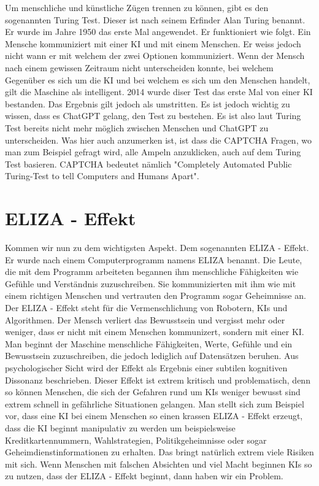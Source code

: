 \documentclass{report}
\begin{document}
Um menschliche und künstliche Zügen trennen zu können, gibt es den sogenannten Turing Test. Dieser ist nach seinem Erfinder Alan Turing benannt. Er wurde im Jahre 1950 das erste Mal angewendet. Er funktioniert wie folgt.
Ein Mensche kommuniziert mit einer KI und mit einem Menschen. Er weiss jedoch nicht wann er mit welchem der zwei Optionen kommuniziert. Wenn der Mensch nach einem gewissen Zeitraum nicht unterscheiden konnte, bei welchem Gegenüber es sich um die KI und bei welchem es sich um den Menschen handelt, gilt die Maschine als intelligent. 2014 wurde diser Test das erste Mal von einer KI bestanden. Das Ergebnis gilt jedoch als umstritten. Es ist jedoch wichtig zu wissen, dass es ChatGPT gelang, den Test zu bestehen. Es ist also laut Turing Test bereits nicht mehr möglich zwischen Menschen und ChatGPT zu unterscheiden. Was hier auch anzumerken ist, ist dass die CAPTCHA Fragen, wo man zum Beispiel gefragt wird, alle Ampeln anzuklicken, auch auf dem Turing Test basieren. CAPTCHA bedeutet nämlich "Completely Automated Public Turing-Test to tell Computers and Humans Apart".

\section{ELIZA - Effekt}
Kommen wir nun zu dem wichtigsten Aspekt. Dem sogenannten ELIZA - Effekt. Er wurde nach einem Computerprogramm namens ELIZA benannt. Die Leute, die mit dem Programm arbeiteten begannen ihm menschliche Fähigkeiten wie Gefühle und Verständnis zuzuschreiben. Sie kommunizierten mit ihm wie mit einem richtigen Menschen und vertrauten den Programm sogar Geheimnisse an. Der ELIZA - Effekt steht für die Vermenschlichung von Robotern, KIs und Algorithmen. Der Mensch verliert das Bewusstsein und vergisst mehr oder weniger, dass er nicht mit einem Menschen kommunizert, sondern mit einer KI. Man beginnt der Maschine menschliche Fähigkeiten, Werte, Gefühle und ein Bewusstsein zuzuschreiben, die jedoch lediglich auf Datensätzen beruhen. Aus psychologischer Sicht wird der Effekt als Ergebnis einer subtilen kognitiven Dissonanz beschrieben. 
Dieser Effekt ist extrem kritisch und problematisch, denn so können Menschen, die sich der Gefahren rund um KIs weniger bewusst sind extrem schnell in gefährliche Situationen gelangen. Man stellt sich zum Beispiel vor, dass eine KI bei einem Menschen so einen krassen ELIZA - Effekt erzeugt, dass die KI beginnt manipulativ zu werden um beispielsweise Kreditkartennummern, Wahlstrategien, Politikgeheimnisse oder sogar Geheimdienstinformationen zu erhalten. Das bringt natürlich extrem viele Risiken mit sich. Wenn Menschen mit falschen Absichten und viel Macht beginnen KIs so zu nutzen, dass der ELIZA - Effekt beginnt, dann haben wir ein Problem. 
\end{document}

